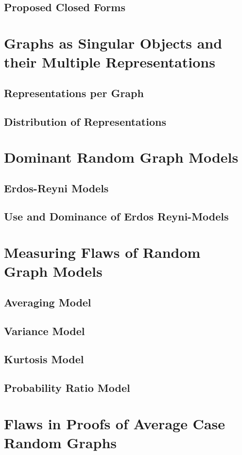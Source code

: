 \documentclass[11pt,a4paper]{report}
\begin{document}
\subsection{Proposed Closed Forms}

\section{Graphs as Singular Objects and their Multiple Representations}
\subsection{Representations per Graph}
\subsection{Distribution of Representations}

\section{Dominant Random Graph Models}
\subsection{Erdos-Reyni Models}
\subsection{Use and Dominance of Erdos Reyni-Models}

\section{Measuring Flaws of Random Graph Models}
\subsection{Averaging Model}
\subsection{Variance Model}
\subsection{Kurtosis Model}
\subsection{Probability Ratio Model}

\section{Flaws in Proofs of Average Case Random Graphs}
\end{document}

